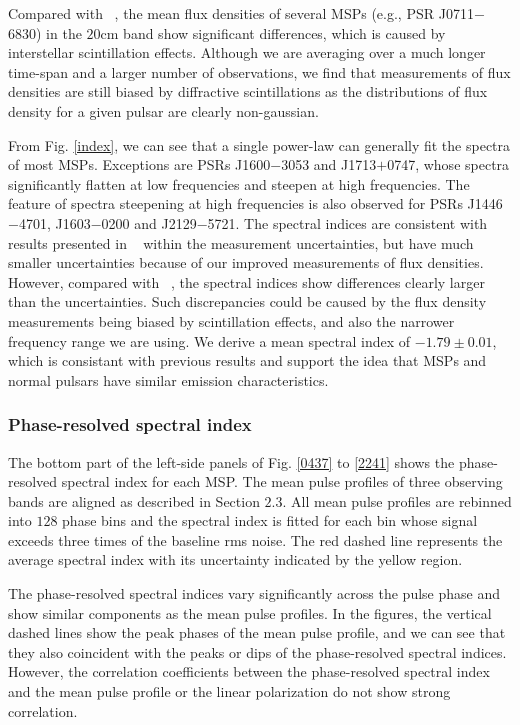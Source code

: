 \documentclass[useAMS,usenatbib]{mn2e}
\begin{document}
Compared with ~\citet{Yan11}, the mean flux densities of several MSPs (e.g., 
PSR J0711$-$6830) in the $20$cm band show significant differences, which is caused by 
interstellar scintillation effects.
%
Although we are averaging over a much longer time-span and a larger number of observations, 
we find that measurements of flux densities are still biased by diffractive 
scintillations as the distributions of flux density for a given pulsar are 
clearly non-gaussian.
%

From Fig. \ref{index}, we can see that a single power-law can generally fit the 
spectra of most MSPs. Exceptions are PSRs J1600$-$3053 and J1713$+$0747, whose spectra 
significantly flatten at low frequencies and steepen at high frequencies.
%
The feature of spectra steepening at high frequencies is also observed for PSRs 
J1446$-$4701, J1603$-$0200 and J2129$-$5721.
%
The spectral indices are consistent with results presented in ~\citet{Toscano98} within 
the measurement uncertainties, but have much smaller uncertainties because of our 
improved measurements of flux densities. 
%
However, compared with ~\citet{Kramer99}, the spectral indices show differences 
clearly larger than the uncertainties.
%
Such discrepancies could be caused by the flux density measurements being biased 
by scintillation effects, and also the narrower frequency range we are using.
%
We derive a mean spectral index of $-1.79\pm0.01$, which is consistant with previous 
results and support the idea that MSPs and normal pulsars have similar emission 
characteristics.
%

\subsubsection{Phase-resolved spectral index}

The bottom part of the left-side panels of Fig. \ref{0437} to \ref{2241} shows the 
phase-resolved spectral index for each MSP. 
%
The mean pulse profiles of three observing bands are aligned as described in 
Section $2.3$. 
%
All mean pulse profiles are rebinned into $128$ phase bins and the spectral 
index is fitted for each bin whose signal exceeds three times of the 
baseline rms noise.
%
The red dashed line represents the average spectral index with its uncertainty 
indicated by the yellow region.
%

The phase-resolved spectral indices vary significantly across the pulse phase 
and show similar components as the mean pulse profiles.
%
In the figures, the vertical dashed lines show the peak phases of the 
mean pulse profile, and we can see that they also coincident with the peaks 
or dips of the phase-resolved spectral indices.
%
However, the correlation coefficients between the phase-resolved spectral 
index and the mean pulse profile or the linear polarization do not show 
strong correlation. 
%
\end{document}
